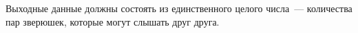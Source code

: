 Выходные данные должны состоять из единственного целого числа~--- количества пар зверюшек,
которые могут слышать друг друга. 